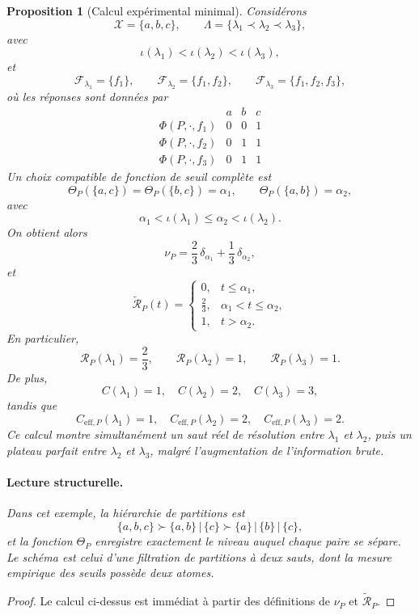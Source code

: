 \documentclass[11pt,a4paper]{article}
\newtheorem{proposition}{Proposition}
\begin{document}
\begin{proposition}[Calcul expérimental minimal]
Considérons
\[
\mathcal X=\{a,b,c\},\qquad \Lambda=\{\lambda_1\prec\lambda_2\prec\lambda_3\},
\]
avec
\[
\iota(\lambda_1)<\iota(\lambda_2)<\iota(\lambda_3),
\]
et
\[
\mathcal F_{\lambda_1}=\{f_1\},\qquad
\mathcal F_{\lambda_2}=\{f_1,f_2\},\qquad
\mathcal F_{\lambda_3}=\{f_1,f_2,f_3\},
\]
où les réponses sont données par
\[
\begin{array}{c|ccc}
& a & b & c \\ \hline
\Phi(P,\cdot,f_1) & 0 & 0 & 1 \\
\Phi(P,\cdot,f_2) & 0 & 1 & 1 \\
\Phi(P,\cdot,f_3) & 0 & 1 & 1
\end{array}
\]
Un choix compatible de fonction de seuil complète est
\[
\Theta_P(\{a,c\})=\Theta_P(\{b,c\})=\alpha_1,
\qquad
\Theta_P(\{a,b\})=\alpha_2,
\]
avec
\[
\alpha_1<\iota(\lambda_1)\le \alpha_2<\iota(\lambda_2).
\]
On obtient alors
\[
\nu_P=\frac23\,\delta_{\alpha_1}+\frac13\,\delta_{\alpha_2},
\]
et
\[
\widetilde{\mathcal R}_P(t)=
\begin{cases}
0,& t\le \alpha_1,\\[0.2em]
\frac23,& \alpha_1<t\le \alpha_2,\\[0.2em]
1,& t>\alpha_2.
\end{cases}
\]
En particulier,
\[
\mathcal R_P(\lambda_1)=\frac23,\qquad
\mathcal R_P(\lambda_2)=1,\qquad
\mathcal R_P(\lambda_3)=1.
\]
De plus,
\[
C(\lambda_1)=1,\quad C(\lambda_2)=2,\quad C(\lambda_3)=3,
\]
tandis que
\[
C_{\mathrm{eff},P}(\lambda_1)=1,\quad
C_{\mathrm{eff},P}(\lambda_2)=2,\quad
C_{\mathrm{eff},P}(\lambda_3)=2.
\]
Ce calcul montre simultanément un saut réel de résolution entre \(\lambda_1\) et \(\lambda_2\), puis un plateau parfait entre \(\lambda_2\) et \(\lambda_3\), malgré l'augmentation de l'information brute.

\paragraph{Lecture structurelle.}
Dans cet exemple, la hiérarchie de partitions est
\[
\{a,b,c\}
\succ
\{a,b\}\,|\,\{c\}
\succ
\{a\}\,|\,\{b\}\,|\,\{c\},
\]
et la fonction \(\Theta_P\) enregistre exactement le niveau auquel chaque paire se sépare. Le schéma est celui d'une filtration de partitions à deux sauts, dont la mesure empirique des seuils possède deux atomes.
\end{proposition}

\begin{proof}
Le calcul ci-dessus est immédiat à partir des définitions de \(\nu_P\) et \(\widetilde{\mathcal R}_P\).
\end{proof}
\end{document}
